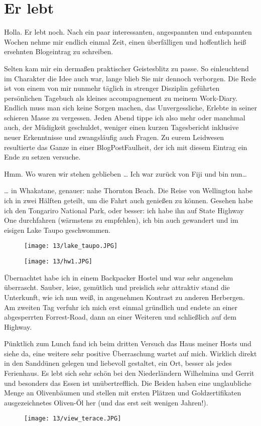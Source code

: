 \chapter{Er lebt}

Holla. Er lebt noch. Nach ein paar interessanten, angespannten und
entspannten Wochen nehme mir endlich einmal Zeit, einen überfälligen und
hoffentlich heiß ersehnten Blogeintrag zu schreiben.

Selten kam mir ein dermaßen praktischer Geistesblitz zu passe. So
einleuchtend im Charakter die Idee auch war, lange blieb Sie mir dennoch
verborgen. Die Rede ist von einem von mir nunmehr täglich in strenger
Disziplin geführten persönlichen Tagebuch als kleines accompagnement zu
meinem Work-Diary. Endlich muss man sich keine Sorgen machen, das
Unvergessliche, Erlebte in seiner schieren Masse zu vergessen. Jeden
Abend tippe ich also mehr oder manchmal auch, der Müdigkeit geschuldet,
weniger einen kurzen Tagesbericht inklusive neuer Erkenntnisse und
zwangsläufig auch Fragen. Zu eurem Leidwesen resultierte das Ganze in
einer BlogPostFaulheit, der ich mit diesem Eintrag ein Ende zu setzen
versuche.

Hmm. Wo waren wir stehen geblieben \ldots{} Ich war zurück von Fiji und
bin nun\ldots{}

\ldots{} in Whakatane, genauer: nahe Thornton Beach. Die Reise von
Wellington habe ich in zwei Hälften geteilt, um die Fahrt auch genießen
zu können. Gesehen habe ich den Tongariro National Park, oder besser:
ich habe ihn auf State Highway One durchfahren (wärmstens zu empfehlen),
ich bin auch gewandert und im eisigen Lake Taupo geschwommen.
\begin{figure}[h]
  \centering
  \texttt{[image: 13/lake\_taupo.JPG]}
\end{figure}
\begin{figure}[h]
  \centering
  \texttt{[image: 13/hw1.JPG]}
\end{figure}

Übernachtet habe ich in einem Backpacker Hostel und war sehr angenehm
überrascht. Sauber, leise, gemütlich und preislich sehr attraktiv stand
die Unterkunft, wie ich nun weiß, in angenehmen Kontrast zu anderen
Herbergen. Am zweiten Tag verfuhr ich mich erst einmal gründlich und
endete an einer abgesperrten Forrest-Road, dann an einer Weiteren und
schließlich auf dem Highway.

Pünktlich zum Lunch fand ich beim dritten
Versuch das Haus meiner Hosts und siehe da, eine weitere sehr positive
Überraschung wartet auf mich. Wirklich direkt in den Sanddünen gelegen
und liebevoll gestaltet, ein Ort, besser als jedes Ferienhaus. Es lebt
sich sehr schön bei den Niederländern Wilhelmina und Gerrit und
besonders das Essen ist unübertrefflich. Die Beiden haben eine
unglaubliche Menge an Olivenbäumen und stellen mit ersten Plätzen und
Goldzertifikaten ausgezeichnetes Oliven-Öl her (und das erst seit
wenigen Jahren!).
\begin{figure}[h]
  \centering
  \texttt{[image: 13/view\_terace.JPG]}
\end{figure}

